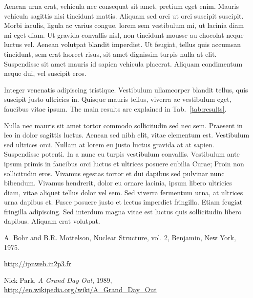 \documentclass[final,12pt]{article}
\begin{document}
Aenean urna erat, vehicula nec consequat sit amet, pretium eget
enim. Mauris vehicula sagittis nisi tincidunt mattis. Aliquam sed orci
ut orci suscipit suscipit. Morbi iaculis, ligula ac varius congue,
lorem sem vestibulum mi, ut lacinia diam mi eget diam. Ut gravida
convallis nisl, non tincidunt mousse au chocolat neque luctus
vel. Aenean volutpat blandit imperdiet. Ut feugiat, tellus quis
accumsan tincidunt, sem erat laoreet risus, sit amet dignissim turpis
nulla at elit. Suspendisse sit amet mauris id sapien vehicula
placerat. Aliquam condimentum neque dui, vel suscipit eros.

Integer venenatis adipiscing tristique. Vestibulum ullamcorper blandit
tellus, quis suscipit justo ultricies in. Quisque mauris tellus,
viverra ac vestibulum eget, faucibus vitae ipsum.  The main results
are explained in Tab.~\ref{tab:results}.

Nulla nec mauris sit amet tortor commodo sollicitudin sed nec
sem. Praesent in leo in dolor sagittis luctus. Aenean sed nibh elit,
vitae elementum est. Vestibulum sed ultrices orci. Nullam at lorem eu
justo luctus gravida at at sapien. Suspendisse potenti. In a nunc eu
turpis vestibulum convallis. Vestibulum ante ipsum primis in faucibus
orci luctus et ultrices posuere cubilia Curae; Proin non sollicitudin
eros. Vivamus egestas tortor et dui dapibus sed pulvinar nunc
bibendum. Vivamus hendrerit, dolor eu ornare lacinia, ipsum libero
ultricies diam, vitae aliquet tellus dolor vel sem. Sed viverra
fermentum urna, at ultrices urna dapibus et. Fusce posuere justo et
lectus imperdiet fringilla. Etiam feugiat fringilla adipiscing. Sed
interdum magna vitae est luctus quis sollicitudin libero
dapibus. Aliquam erat volutpat.


%
\begin{thebibliography}{}
%
%
A. Bohr and B.R. Mottelson, Nuclear Structure, vol. 2, Benjamin,
New York, 1975.

 \url{http://ipnweb.in2p3.fr}

 Nick Park, \textsl{A Grand Day Out}, 1989, \url{http://en.wikipedia.org/wiki/A_Grand_Day_Out}

\end{thebibliography}
\end{document}
